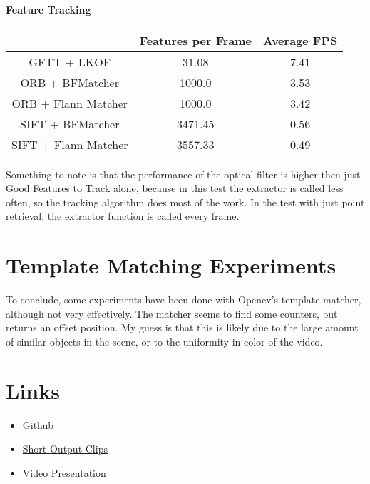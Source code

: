 \documentclass[conference]{IEEEtran}
\begin{document}
\begin{center}
	\textbf{Feature Tracking}\\
	\begin{tabular}{||c c c||} 
	 \hline
	 & Features per Frame & Average FPS \\ [0.5ex] 
	 \hline\hline
	 GFTT + LKOF & 31.08 & 7.41 \\ 
	 \hline
	 ORB + BFMatcher & 1000.0 & 3.53 \\
	 \hline
	 ORB + Flann Matcher & 1000.0 & 3.42 \\
	 \hline
	 SIFT + BFMatcher & 3471.45 & 0.56 \\
	 \hline
	 SIFT + Flann Matcher & 3557.33 & 0.49 \\
	 \hline
	\end{tabular}
\end{center}

Something to note is that the performance of the optical filter is higher then just Good Features to Track alone, because in this test the extractor 
is called less often, so the tracking algorithm does most of the work. 
In the test with just point retrieval, the extractor function is called every frame.


\section{Template Matching Experiments}

To conclude, some experiments have been done with Opencv's template matcher, although not very effectively. 
The matcher seems to find some counters, but returns an offset position. My guess is that this is 
likely due to the large amount of similar objects in the scene, or to the uniformity in color of the video. 


\section{Links}

\begin{itemize}
    \item \href{http://www.overleaf.com}{Github} 
    \item \href{https://drive.google.com/file/d/1OssPwOR97STaiHRiAeliSH2cpHP-4XCJ/view?usp=sharing}{Short Output Clips} 
    \item \href{https://drive.google.com/file/d/1r-y5-ALC4fAHzOlGfd5zgIg0w363ghtm/view?usp=sharing}{Video Presentation} 
\end{itemize}



\end{document}
